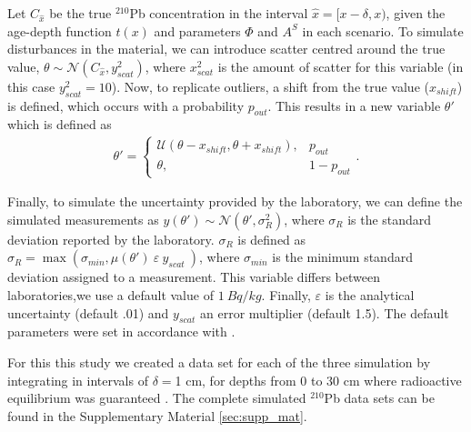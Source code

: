 \documentclass [10pt] {article}
\begin{document}
	Let $C_{\hat{x}}$ be the true $^{210}$Pb concentration in the interval $\hat{x}=[ x-\delta, x)$, given the age-depth function $t(x)$ and parameters $\Phi$ and $A^S$ in each scenario. 
To simulate disturbances in the material, we can introduce scatter centred around the true value, $\theta \sim \mathcal{N}\left(C_{\hat{x}},y^2_{scat}\right)$, where $x^2_{scat}$ is the amount of scatter for this variable (in this case $y^2_{scat}=10$). 
Now, to replicate outliers, a shift from the true value ($x_{shift}$) is defined, which occurs with a probability $p_{out}$. This results in a new variable $\theta'$ which is defined as
\begin{align}
	\theta' = \begin{cases}
			\mathcal{U}(\theta - x_{shift},\theta + x_{shift}), &  p_{out} \\
			\theta, & 1-p_{out}
		\end{cases}.
\end{align}

	Finally, to simulate the uncertainty provided by the laboratory, we can define the simulated measurements as  $y(\theta')\sim\mathcal{N}\left(\theta',\sigma_R^2\right)$, where $\sigma_R$ is the standard deviation reported by the laboratory. 
$\sigma_R$ is defined as $\sigma_R= \max \left(\sigma_{min}, \mu(\theta')~\varepsilon~y_{scat}~\right)$, where $\sigma_{min}$ is the minimum standard deviation assigned to a measurement. This variable differs between laboratories,we use a default value of $1~ Bq/kg$. 
Finally, $\varepsilon$ is the analytical uncertainty (default .01) and $y_{scat}$ an error multiplier (default 1.5).
The default parameters were set in accordance with \citet{Blaauw2018}.


For this this study we created a data set for each of the three simulation by integrating in intervals of $\delta =$1 cm, for depths from  0 to 30 cm where radioactive equilibrium was guaranteed \citep{Aquino2018}.
The complete simulated $^{210}$Pb data sets can be found in the Supplementary Material \ref{sec:supp_mat}.
\end{document}
